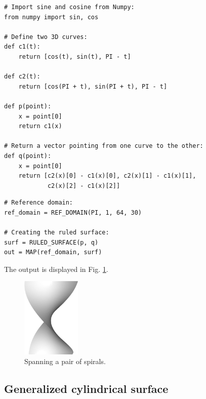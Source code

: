 \begin{bbox}
\begin{verbatim}
# Import sine and cosine from Numpy:
from numpy import sin, cos

# Define two 3D curves:
def c1(t):
    return [cos(t), sin(t), PI - t]

def c2(t):
    return [cos(PI + t), sin(PI + t), PI - t]
  
def p(point):
    x = point[0]
    return c1(x)
  
# Return a vector pointing from one curve to the other:
def q(point):
    x = point[0]
    return [c2(x)[0] - c1(x)[0], c2(x)[1] - c1(x)[1], 
            c2(x)[2] - c1(x)[2]]
\end{verbatim}
\end{bbox}  
\newpage
\begin{bbox}
\begin{verbatim}
# Reference domain:
ref_domain = REF_DOMAIN(PI, 1, 64, 30)

# Creating the ruled surface:
surf = RULED_SURFACE(p, q)
out = MAP(ref_domain, surf)
\end{verbatim}
\end{bbox}
\vspace{6mm}

\noindent
The output is displayed in Fig. \ref{fig:curves-10b}.\\

\begin{figure}[!ht]
\begin{center}
\includegraphics[width=0.25\textwidth]{img/curves-10b.png}
\end{center}
\vspace{-4mm}
\caption{Spanning a pair of spirals.}
\label{fig:curves-10b}
\vspace{-1cm}
\end{figure}
\noindent

\subsection{Generalized cylindrical surface}

